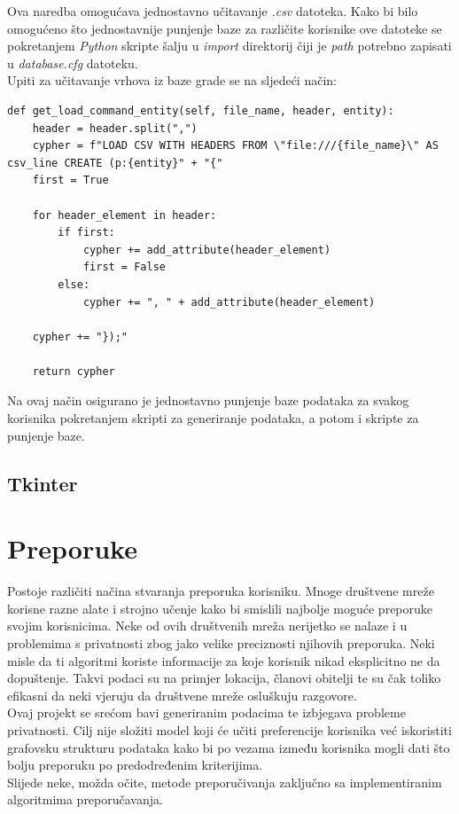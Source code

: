 \documentclass[titlepage, 12pt]{scrartcl}
\begin{document}
Ova naredba omogućava jednostavno učitavanje \emph{.csv} datoteka. Kako bi bilo omogućeno što jednostavnije punjenje baze za različite korisnike ove datoteke se pokretanjem \emph{Python} skripte šalju u \emph{import} direktorij čiji je \emph{path} potrebno zapisati u \emph{database.cfg} datoteku. \\
Upiti za učitavanje vrhova iz baze grade se na sljedeći način:
\begin{samepage}
\begin{verbatim}
def get_load_command_entity(self, file_name, header, entity):
    header = header.split(",")
    cypher = f"LOAD CSV WITH HEADERS FROM \"file:///{file_name}\" AS csv_line CREATE (p:{entity}" + "{"
    first = True

    for header_element in header:
        if first:
            cypher += add_attribute(header_element)
            first = False
        else:
            cypher += ", " + add_attribute(header_element)

    cypher += "});"

    return cypher
\end{verbatim}
\end{samepage}
Na ovaj način osigurano je jednostavno punjenje baze podataka za svakog korisnika pokretanjem skripti za generiranje podataka, a potom i skripte za punjenje baze.
\subsection{Tkinter}
\newpage

\section{Preporuke}
Postoje različiti načina stvaranja preporuka korisniku. Mnoge društvene mreže korisne razne alate i strojno učenje kako bi smislili najbolje moguće preporuke svojim korisnicima.
Neke od ovih društvenih mreža nerijetko se nalaze i u problemima s privatnosti zbog jako velike preciznosti njihovih preporuka.
Neki misle da ti algoritmi koriste informacije za koje korisnik nikad eksplicitno ne da dopuštenje. Takvi podaci su na primjer lokacija, članovi obitelji te su čak toliko efikasni da neki vjeruju da društvene mreže osluškuju razgovore. \\
Ovaj projekt se srećom bavi generiranim podacima te izbjegava probleme privatnosti. Cilj nije složiti model koji će učiti preferencije korisnika već iskoristiti grafovsku strukturu podataka kako bi po vezama između korisnika mogli dati što bolju preporuku po predodređenim kriterijima. \\
Slijede neke, možda očite, metode preporučivanja zaključno sa implementiranim algoritmima preporučavanja.
\end{document}
